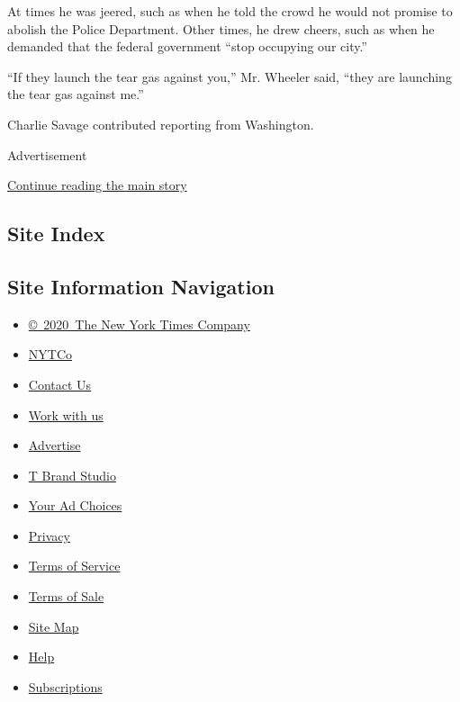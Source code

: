 At times he was jeered, such as when he told the crowd he would not
promise to abolish the Police Department. Other times, he drew cheers,
such as when he demanded that the federal government ``stop occupying
our city.''

``If they launch the tear gas against you,'' Mr. Wheeler said, ``they
are launching the tear gas against me.''

Charlie Savage contributed reporting from Washington.

Advertisement

\protect\hyperlink{after-bottom}{Continue reading the main story}

\hypertarget{site-index}{%
\subsection{Site Index}\label{site-index}}

\hypertarget{site-information-navigation}{%
\subsection{Site Information
Navigation}\label{site-information-navigation}}

\begin{itemize}
\tightlist
\item
  \href{https://help.nytimes.com/hc/en-us/articles/115014792127-Copyright-notice}{©~2020~The
  New York Times Company}
\end{itemize}

\begin{itemize}
\tightlist
\item
  \href{https://www.nytco.com/}{NYTCo}
\item
  \href{https://help.nytimes.com/hc/en-us/articles/115015385887-Contact-Us}{Contact
  Us}
\item
  \href{https://www.nytco.com/careers/}{Work with us}
\item
  \href{https://nytmediakit.com/}{Advertise}
\item
  \href{http://www.tbrandstudio.com/}{T Brand Studio}
\item
  \href{https://www.nytimes.com/privacy/cookie-policy\#how-do-i-manage-trackers}{Your
  Ad Choices}
\item
  \href{https://www.nytimes.com/privacy}{Privacy}
\item
  \href{https://help.nytimes.com/hc/en-us/articles/115014893428-Terms-of-service}{Terms
  of Service}
\item
  \href{https://help.nytimes.com/hc/en-us/articles/115014893968-Terms-of-sale}{Terms
  of Sale}
\item
  \href{https://spiderbites.nytimes.com}{Site Map}
\item
  \href{https://help.nytimes.com/hc/en-us}{Help}
\item
  \href{https://www.nytimes.com/subscription?campaignId=37WXW}{Subscriptions}
\end{itemize}
